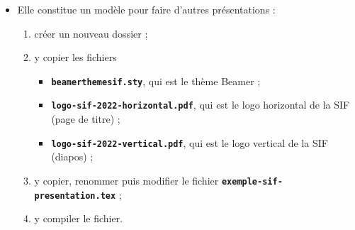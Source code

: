   \begin{itemize}
  \item Elle constitue un modèle pour faire d'autres présentations :
    
    \begin{enumerate}
    \item créer un nouveau dossier ;
    \item y copier les fichiers 

      \begin{itemize}
      \item \texttt{\textbf{beamerthemesif.sty}}, qui est le thème Beamer ;
      \item \texttt{\textbf{logo-sif-2022-horizontal.pdf}}, qui est le logo horizontal de la SIF (page de titre) ;
      \item \texttt{\textbf{logo-sif-2022-vertical.pdf}}, qui est le logo vertical de la SIF (diapos) ;
      \end{itemize}

    \item y copier, renommer puis modifier le fichier \texttt{\textbf{exemple-sif-presentation.tex}} ;
    \item y compiler le fichier.
    \end{enumerate}
  \end{itemize}
